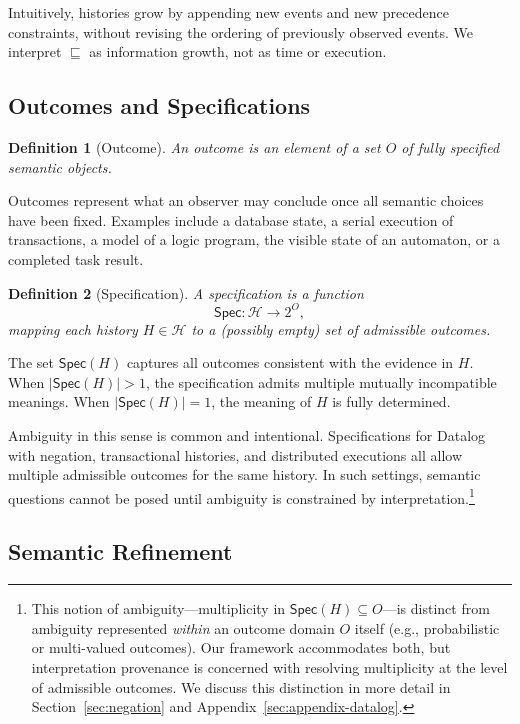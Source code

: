 \documentclass[acmsmall,nonacm]{acmart}
\newtheorem{definition}{Definition}
\theoremstyle{remark}
\numberwithin{definition}{section}
\numberwithin{theorem}{section}
\numberwithin{lemma}{section}
\numberwithin{corollary}{section}
\numberwithin{remark}{section}
\numberwithin{example}{section}
\numberwithin{observation}{section}
\numberwithin{assumption}{section}
\newcommand{\Hist}{\mathcal{H}}
\newcommand{\Spec}{\mathsf{Spec}}
\begin{document}
Intuitively, histories grow by appending new events and new precedence constraints,
without revising the ordering of previously observed events.
We interpret $\sqsubseteq$ as information growth, not as time or execution.

\subsection{Outcomes and Specifications}

\begin{definition}[Outcome]
An \emph{outcome} is an element of a set $O$ of fully specified semantic objects.
\end{definition}

Outcomes represent what an observer may conclude once all semantic choices have
been fixed.
Examples include a database state, a serial execution of transactions, a model of
a logic program, the visible state of an automaton, or a completed task result.

\begin{definition}[Specification]
A \emph{specification} is a function
\[
  \Spec : \Hist \to 2^{O},
\]
mapping each history $H \in \Hist$ to a (possibly empty) set of admissible outcomes.
\end{definition}

The set $\Spec(H)$ captures all outcomes consistent with the evidence in $H$.
When $|\Spec(H)| > 1$, the specification admits multiple mutually incompatible
meanings.
When $|\Spec(H)| = 1$, the meaning of $H$ is fully determined.

Ambiguity in this sense is common and intentional.
Specifications for Datalog with negation, transactional histories, and distributed
executions all allow multiple admissible outcomes for the same history.
In such settings, semantic questions cannot be posed until ambiguity is constrained
by interpretation.\footnote{%
This notion of ambiguity—multiplicity in $\Spec(H) \subseteq O$—is distinct from
ambiguity represented \emph{within} an outcome domain $O$ itself (e.g., probabilistic
or multi-valued outcomes).
Our framework accommodates both, but interpretation provenance is concerned with
resolving multiplicity at the level of admissible outcomes.
We discuss this distinction in more detail in Section~\ref{sec:negation} and
Appendix~\ref{sec:appendix-datalog}.}


\subsection{Semantic Refinement}
\end{document}
